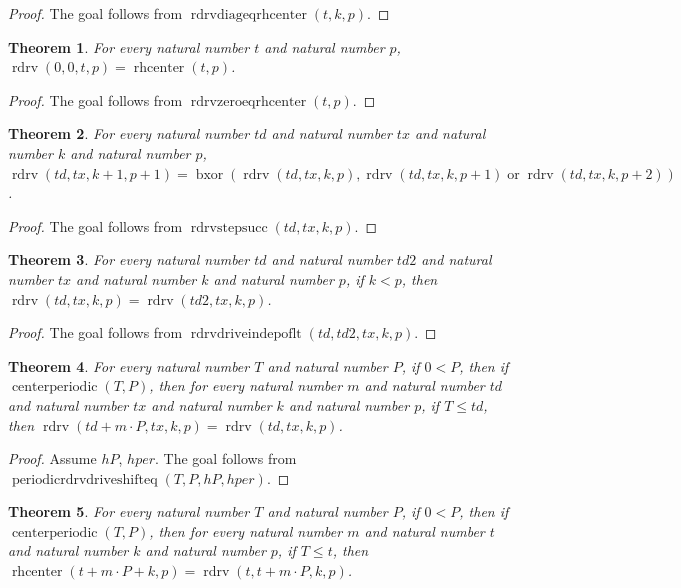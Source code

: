 \documentclass[11pt]{article}
\newtheorem{theorem}{Theorem}[section]
\theoremstyle{definition}
\begin{document}
\begin{proof}
The goal follows from \(\operatorname{rdrvdiageqrhcenter}(t, k, p)\).
\end{proof}
\begin{theorem}
\label{ll:paper:rdrv-zero-eq-rhcenter}
For every natural number \(t\) and natural number \(p\), \(\operatorname{rdrv}(0, 0, t, p) = \operatorname{rhcenter}(t, p)\).
\end{theorem}
\begin{proof}
The goal follows from \(\operatorname{rdrvzeroeqrhcenter}(t, p)\).
\end{proof}
\begin{theorem}
\label{ll:paper:rdrv-step-succ}
For every natural number \(td\) and natural number \(tx\) and natural number \(k\) and natural number \(p\), \(\operatorname{rdrv}(td, tx, k + 1, p + 1) = \operatorname{bxor}(\operatorname{rdrv}(td, tx, k, p), \operatorname{rdrv}(td, tx, k, p + 1) \operatorname{or} \operatorname{rdrv}(td, tx, k, p + 2))\).
\end{theorem}
\begin{proof}
The goal follows from \(\operatorname{rdrvstepsucc}(td, tx, k, p)\).
\end{proof}
\begin{theorem}
\label{ll:paper:rdrv-drive-indep-of-lt}
For every natural number \(td\) and natural number \(td2\) and natural number \(tx\) and natural number \(k\) and natural number \(p\), if \(k < p\), then \(\operatorname{rdrv}(td, tx, k, p) = \operatorname{rdrv}(td2, tx, k, p)\).
\end{theorem}
\begin{proof}
The goal follows from \(\operatorname{rdrvdriveindepoflt}(td, td2, tx, k, p)\).
\end{proof}
\begin{theorem}
\label{ll:paper:periodic-rdrv-drive-shift-eq}
For every natural number \(T\) and natural number \(P\), if \(0 < P\), then if \(\operatorname{centerperiodic}(T, P)\), then for every natural number \(m\) and natural number \(td\) and natural number \(tx\) and natural number \(k\) and natural number \(p\), if \(T \le td\), then \(\operatorname{rdrv}(td + m \cdot P, tx, k, p) = \operatorname{rdrv}(td, tx, k, p)\).
\end{theorem}
\begin{proof}
Assume \(hP\), \(hper\).
The goal follows from \(\operatorname{periodicrdrvdriveshifteq}(T, P, hP, hper)\).
\end{proof}
\begin{theorem}
\label{ll:paper:periodic-rhcenter-shift-eq-rdrv-same-drive}
For every natural number \(T\) and natural number \(P\), if \(0 < P\), then if \(\operatorname{centerperiodic}(T, P)\), then for every natural number \(m\) and natural number \(t\) and natural number \(k\) and natural number \(p\), if \(T \le t\), then \(\operatorname{rhcenter}(t + m \cdot P + k, p) = \operatorname{rdrv}(t, t + m \cdot P, k, p)\).
\end{theorem}
\end{document}
